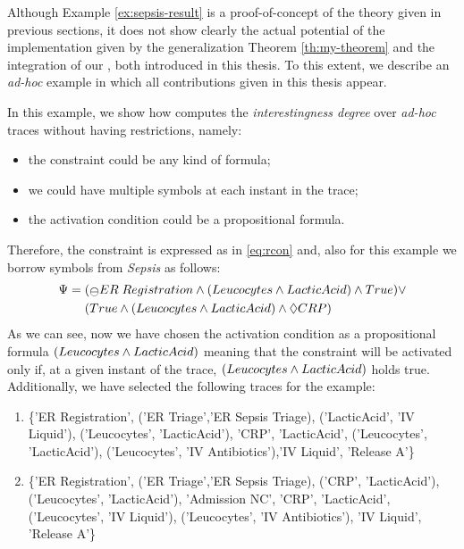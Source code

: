 Although Example \ref{ex:sepsis-result} is a proof-of-concept of the theory given in previous sections, it does not show clearly the actual potential of the \janus implementation given by the generalization Theorem \ref{th:my-theorem} and the integration of our \LTLfToDFA, both introduced in this thesis. To this extent, we describe an \textit{ad-hoc} example in which all contributions given in this thesis appear.

\begin{example}\label{ex:adhoc-result}
In this example, we show how \janus computes the \textit{interestingness degree} over \textit{ad-hoc} traces without having restrictions, namely:

\begin{itemize}
\item the constraint could be any kind of formula;
\item we could have multiple symbols at each instant in the trace;
\item the activation condition could be a propositional formula.
\end{itemize}

\noindent Therefore, the constraint is expressed as in \ref{eq:rcon} and, also for this example we borrow symbols from \textit{Sepsis} as follows:
\begin{align*}
\Psi = \;& (\Yesterday ER\; Registration \lAND (Leucocytes \lAND LacticAcid) \lAND True) \lOR\\
& (True \lAND (Leucocytes \lAND LacticAcid) \lAND \Diamond CRP)
\end{align*}
As we can see, now we have chosen the activation condition as a propositional formula $(Leucocytes \wedge LacticAcid)$ meaning that the constraint will be activated only if, at a given instant of the trace, $(Leucocytes \wedge LacticAcid)$ holds true.
Additionally, we have selected the following traces for the example:
\begin{enumerate}
\item \label{list:adhoc-trace1} \{'ER Registration', ('ER Triage','ER Sepsis Triage), ('LacticAcid', 'IV Liquid'),  ('Leucocytes', 'LacticAcid'), 'CRP', 'LacticAcid', ('Leucocytes', 'LacticAcid'), ('Leucocytes', 'IV Antibiotics'),'IV Liquid', 'Release A'\}
\item \label{list:adhoc-trace2} \{'ER Registration', ('ER Triage','ER Sepsis Triage), ('CRP', 'LacticAcid'),  ('Leucocytes', 'LacticAcid'), 'Admission NC', 'CRP', 'LacticAcid', ('Leucocytes', 'IV Liquid'), ('Leucocytes', 'IV Antibiotics'), 'IV Liquid', 'Release A'\}
\end{enumerate}


\end{example}
